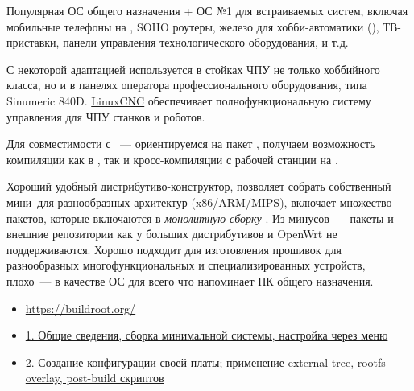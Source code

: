 \label{mlinux}\secdown

Популярная ОС общего назначения + ОС №1 для встраиваемых систем, включая мобильные телефоны на \andr,
SOHO роутеры, железо для хобби-автоматики (\rpi), ТВ-приставки, панели управления технологического оборудования, и т.д.

С некоторой адаптацией используется в стойках ЧПУ не только хоббийного класса, но и в панелях оператора профессионального
оборудования, типа Sinumeric 840D. \href{http://linuxcnc.org/}{LinuxCNC} обеспечивает полнофункциональную систему управления
для ЧПУ станков и роботов.

\bigskip
Для совместимости с \win\ --- ориентируемся на пакет \href{http://www.mingw.org/}{\mingw},
получаем возможность компиляции как в \win, так и кросс-компиляции с рабочей станции на \linux.

\clearpage
{}\label{br}

Хороший удобный дистрибутиво-конструктор, позволяет собрать собственный мини\linux\ для разнообразных
архитектур (x86/ARM/MIPS), включает множество пакетов, которые включаются в \emph{монолитную сборку \linux}.
Из минусов\ --- пакеты и внешние репозитории как у больших дистрибутивов и OpenWrt не поддерживаются.
Хорошо подходит для изготовления прошивок для разнообразных многофункциональных и специализированных устройств,
плохо\ --- в качестве ОС для всего что напоминает ПК общего назначения.

\begin{itemize}
    \item \url{https://buildroot.org/}
    \item \href{https://habr.com/ru/post/448638/}{1. Общие сведения, сборка минимальной системы, настройка через меню}
    \item \href{https://habr.com/ru/post/449348/}{2. Создание конфигурации своей платы; применение external tree, rootfs-overlay, post-build скриптов}
\end{itemize}


\secup
